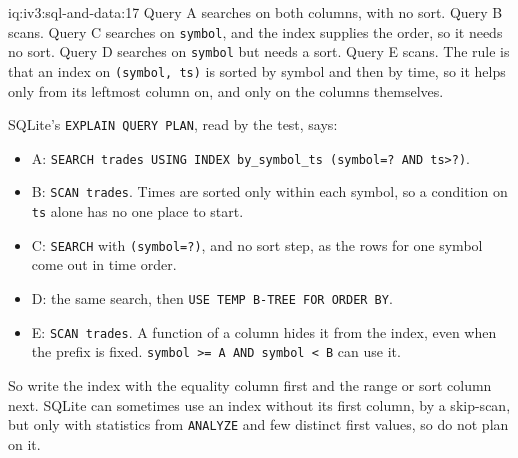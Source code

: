 \begin{solution}{iq:iv3:sql-and-data:17}
Query A searches on both columns, with no sort. Query B scans. Query C searches on \texttt{symbol}, and the index supplies the order, so it needs no sort. Query D searches on \texttt{symbol} but needs a sort. Query E scans. The rule is that an index on \texttt{(symbol, ts)} is sorted by symbol and then by time, so it helps only from its leftmost column on, and only on the columns themselves.

SQLite's \texttt{EXPLAIN QUERY PLAN}, read by the test, says:
\begin{itemize}
\item A: \texttt{SEARCH trades USING INDEX by\_symbol\_ts (symbol=? AND ts>?)}.
\item B: \texttt{SCAN trades}. Times are sorted only within each symbol, so a condition on \texttt{ts} alone has no one place to start.
\item C: \texttt{SEARCH} with \texttt{(symbol=?)}, and no sort step, as the rows for one symbol come out in time order.
\item D: the same search, then \texttt{USE TEMP B-TREE FOR ORDER BY}.
\item E: \texttt{SCAN trades}. A function of a column hides it from the index, even when the prefix is fixed. \texttt{symbol >= \textquotesingle{}A\textquotesingle{} AND symbol < \textquotesingle{}B\textquotesingle{}} can use it.
\end{itemize}

So write the index with the equality column first and the range or sort column next. SQLite can sometimes use an index without its first column, by a skip-scan, but only with statistics from \texttt{ANALYZE} and few distinct first values, so do not plan on it.

\end{solution}

